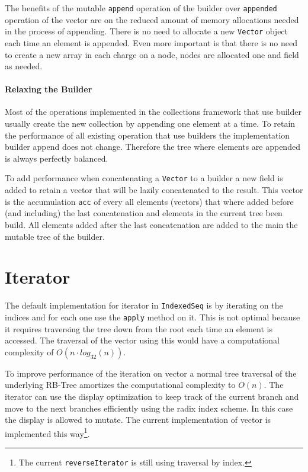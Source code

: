 The benefits of the mutable \texttt{append} operation of the builder over \texttt{appended} operation of the vector are on the reduced amount of memory allocations needed in the process of appending. There is no need to allocate a new \texttt{Vector} object each time an element is appended. Even more important is that there is no need to create a new array in each charge on a node, nodes are allocated one and field as needed. 

\paragraph{Relaxing the Builder}
Most of the operations implemented in the collections framework that use builder usually create the new collection by appending one element at a time. To retain the performance of all existing operation that use builders the implementation builder append does not change. Therefore the tree where elements are appended is always perfectly balanced.
 
 To add performance when concatenating a \texttt{Vector} to a builder a new field is added to retain a vector that will be lazily concatenated to the result. This vector is the accumulation \texttt{acc} of every all elements (vectors) that where added before (and including) the last concatenation and elements in the current tree been build. All elements added after the last concatenation are added to the main the mutable tree of the builder.


\clearpage
\section{Iterator}
The default implementation for iterator in \texttt{IndexedSeq} is by iterating on the indices and for each one use the \texttt{apply} method on it. This is not optimal because it requires traversing the tree down from the root each time an element is accessed. The traversal of the vector using this would have a computational complexity of $O(n \cdot log_{32}(n))$.

To improve performance of the iteration on vector a normal tree traversal of the underlying RB-Tree amortizes the computational complexity to $O(n)$. The iterator can use the display optimization to keep track of the current branch and move to the next branches efficiently using the radix index scheme. In this case the display is allowed to mutate. The current implementation of vector is implemented this way\footnote{The current \texttt{reverseIterator} is still using traversal by index.}. 

